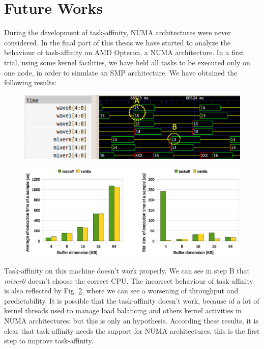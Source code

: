 \section{Future Works}

During the development of task-affinity, NUMA architectures were never considered. In the final part of this thesis we have started to analyze the 
behaviour of task-affinity on AMD Opteron, a NUMA architecture. In a first trial, using some kernel facilities, we have held all tasks to be executed only 
on one node, in order to simulate an SMP architecture. We have obtained the following results:

\begin{figure}[htbp]
\centering
\includegraphics[width=\widefigure]{images/results_AMD/final_AMD.eps}
\caption{}
\label{fig:trace_AMD}
\end{figure}

\begin{figure}[htbp]
\centering
\includegraphics[width=\widefigure]{images/results_AMD/time_avg_var_AMD.eps}
\caption{}
\label{fig:time_avg_var_AMD}
\end{figure}

Task-affinity on this machine doesn't work properly. We can see in step B that \textit{mixer0} doesn't choose the correct CPU. The incorrect behaviour of 
task-affinity is also reflected by Fig. \ref{fig:time_avg_var_AMD}, where we can see a worsening of throughput and predictability. It is possible that the 
task-affinity doesn't work, because of a lot of kernel threads used to manage load balancing and others kernel activities in NUMA architectures: but this is 
only an hypothesis. According these results, it is clear that task-affinity needs the support for NUMA architectures, this is the first step to improve 
task-affinity.

